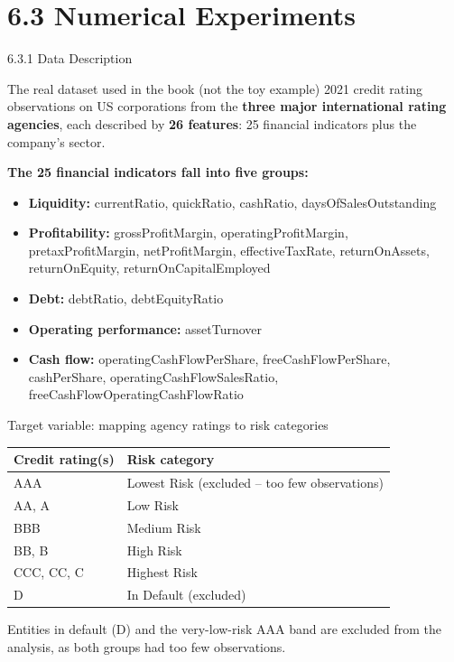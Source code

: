 \documentclass[aspectratio=169,10pt]{beamer}
\begin{document}
\section{6.3 Numerical Experiments}

\begin{frame}[allowframebreaks]{6.3.1 Data Description}
  \begin{block}{The real dataset used in the book (not the toy example)}
    2021 credit rating observations on US corporations from the \textbf{three
    major international rating agencies}, each described by \textbf{26
    features}: 25 financial indicators plus the company's sector.
  \end{block}
  \textbf{The 25 financial indicators fall into five groups:}
  \begin{itemize}
    \item \textbf{Liquidity:} currentRatio, quickRatio, cashRatio,
          daysOfSalesOutstanding
    \item \textbf{Profitability:} grossProfitMargin, operatingProfitMargin,
          pretaxProfitMargin, netProfitMargin, effectiveTaxRate,
          returnOnAssets, returnOnEquity, returnOnCapitalEmployed
    \item \textbf{Debt:} debtRatio, debtEquityRatio
    \item \textbf{Operating performance:} assetTurnover
    \item \textbf{Cash flow:} operatingCashFlowPerShare, freeCashFlowPerShare,
          cashPerShare, operatingCashFlowSalesRatio,
          freeCashFlowOperatingCashFlowRatio
  \end{itemize}

  \framebreak

  \begin{block}{Target variable: mapping agency ratings to risk categories}
    \centering
    \renewcommand{\arraystretch}{1.1}
    \begin{tabular}{ll}
      \toprule
      \textbf{Credit rating(s)} & \textbf{Risk category}\\
      \midrule
      AAA & Lowest Risk (excluded -- too few observations)\\
      AA, A & Low Risk\\
      BBB & Medium Risk\\
      BB, B & High Risk\\
      CCC, CC, C & Highest Risk\\
      D & In Default (excluded)\\
      \bottomrule
    \end{tabular}
  \end{block}
  \vspace{0.3em}
  Entities in default (D) and the very-low-risk AAA band are excluded from
  the analysis, as both groups had too few observations.
\end{frame}
\end{document}

